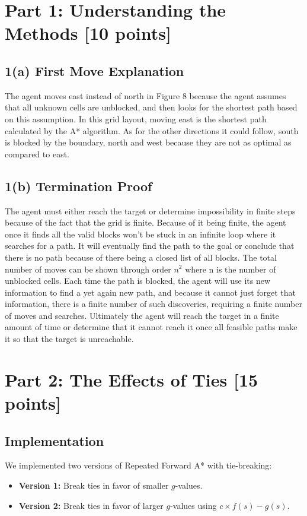 \documentclass[12pt]{article}
\begin{document}
\section*{Part 1: Understanding the Methods [10 points]}
\label{sec:part1}

\subsection*{1(a) First Move Explanation}
The agent moves east instead of north in Figure 8 because the agent assumes that all unknown cells are unblocked, and then looks for the shortest path based on this assumption. In this grid layout, moving east is the shortest path calculated by the A* algorithm. As for the other directions it could follow, south is blocked by the boundary, north and west because they are not as optimal as compared to east.

\subsection*{1(b) Termination Proof}
The agent must either reach the target or determine impossibility in finite steps because of the fact that the grid is finite. Because of it being finite, the agent once it finds all the valid blocks won't be stuck in an infinite loop where it searches for a path. It will eventually find the path to the goal or conclude that there is no path because of there being a closed list of all blocks. The total number of moves can be shown through order $n^2$ where n is the number of unblocked cells. Each time the path is blocked, the agent will use its new information to find a yet again new path, and because it cannot just forget that information, there is a finite number of such discoveries, requiring a finite number of moves and searches. Ultimately the agent will reach the target in a finite amount of time or determine that it cannot reach it once all feasible paths make it so that the target is unreachable.


\section*{Part 2: The Effects of Ties [15 points]}
\label{sec:part2}

\subsection*{Implementation}
We implemented two versions of Repeated Forward A* with tie-breaking:
\begin{itemize}
    \item \textbf{Version 1:} Break ties in favor of smaller \(g\)-values.
    \item \textbf{Version 2:} Break ties in favor of larger \(g\)-values using \(c \times f(s) - g(s)\).
\end{itemize}
\end{document}

